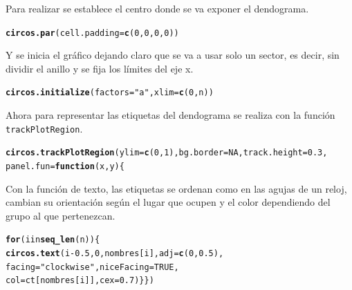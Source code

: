 \documentclass{article}\usepackage[]{graphicx}\usepackage[]{color}
\makeatletter
\newcommand{\hlnum}[1]{\textcolor[rgb]{0.686,0.059,0.569}{#1}}%
\newcommand{\hlstr}[1]{\textcolor[rgb]{0.192,0.494,0.8}{#1}}%
\newcommand{\hlstd}[1]{\textcolor[rgb]{0.345,0.345,0.345}{#1}}%
\newcommand{\hlkwc}[1]{\textcolor[rgb]{0.333,0.667,0.333}{#1}}%
\newcommand{\hlkwd}[1]{\textcolor[rgb]{0.737,0.353,0.396}{\textbf{#1}}}%
\newenvironment{kframe}{%
 \def\at@end@of@kframe{}%
 \ifinner\ifhmode%
  \def\at@end@of@kframe{\end{minipage}}%
  \begin{minipage}{\columnwidth}%
 \fi\fi%
 \def\FrameCommand##1{\hskip\@totalleftmargin \hskip-\fboxsep
 \colorbox{shadecolor}{##1}\hskip-\fboxsep
     \hskip-\linewidth \hskip-\@totalleftmargin \hskip\columnwidth}%
 \MakeFramed {\advance\hsize-\width
   \@totalleftmargin\z@ \linewidth\hsize
   \@setminipage}}%
 {\par\unskip\endMakeFramed%
 \at@end@of@kframe}
\newenvironment{knitrout}{}{} %
\makeatother
\begin{document}
Para realizar se establece el centro donde se va exponer el dendograma.
\begin{knitrout}
\color{fgcolor}\begin{kframe}
\begin{alltt}
\hlkwd{circos.par}\hlstd{(}\hlkwc{cell.padding} \hlstd{=} \hlkwd{c}\hlstd{(}\hlnum{0}\hlstd{,} \hlnum{0}\hlstd{,} \hlnum{0}\hlstd{,} \hlnum{0}\hlstd{))}
\end{alltt}
\end{kframe}
\end{knitrout}
Y se inicia el gr\'afico dejando claro que se va a usar solo un sector, es decir, sin dividir el anillo y se fija los l\'imites del eje x.
\begin{knitrout}
\color{fgcolor}\begin{kframe}
\begin{alltt}
\hlkwd{circos.initialize}\hlstd{(}\hlkwc{factors} \hlstd{=} \hlstr{"a"}\hlstd{,} \hlkwc{xlim} \hlstd{=} \hlkwd{c}\hlstd{(}\hlnum{0}\hlstd{, n))}
\end{alltt}
\end{kframe}
\end{knitrout}
Ahora para representar las etiquetas del dendograma se realiza con la funci\'on \texttt{trackPlotRegion}.
\begin{knitrout}
\color{fgcolor}\begin{kframe}
\begin{alltt}
\hlkwd{circos.trackPlotRegion}(ylim = \hlkwd{c}(0, 1), bg.border = NA, track.height = 0.3,
                       panel.fun = \hlkwd{function}(x, y) \{
\end{alltt}
\end{kframe}
\end{knitrout}
Con la funci\'on de texto, las etiquetas se ordenan como en las agujas de un reloj, cambian su orientaci\'on seg\'un el lugar que ocupen y el color dependiendo del grupo al que pertenezcan.
\begin{knitrout}
\color{fgcolor}\begin{kframe}
\begin{alltt}
                         \hlkwd{for}(i in \hlkwd{seq_len}(n)) \{
                           \hlkwd{circos.text}(i-0.5, 0, nombres[i], adj = \hlkwd{c}(0, 0.5),
                                       facing = \hlstr{"clockwise"}, niceFacing = TRUE,
                                       col = ct[nombres[i]], cex = 0.7)\}\})
\end{alltt}
\end{kframe}
\end{knitrout}
\end{document}
